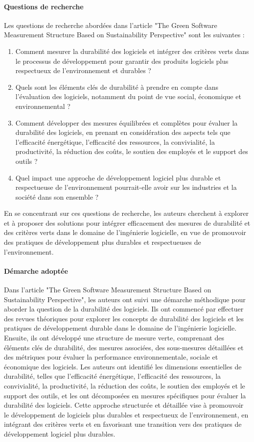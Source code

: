 \paragraph{Questions de recherche}
Les questions de recherche abordées dans l'article "The Green Software Measurement Structure Based on Sustainability Perspective" sont les suivantes :
\begin{enumerate}
    \item Comment mesurer la durabilité des logiciels et intégrer des critères verts dans le processus de développement pour garantir des produits logiciels plus respectueux de l'environnement et durables ?
    \item Quels sont les éléments clés de durabilité à prendre en compte dans l'évaluation des logiciels, notamment du point de vue social, économique et environnemental ?
    \item Comment développer des mesures équilibrées et complètes pour évaluer la durabilité des logiciels, en prenant en considération des aspects tels que l'efficacité énergétique, l'efficacité des ressources, la convivialité, la productivité, la réduction des coûts, le soutien des employés et le support des outils ?
    \item Quel impact une approche de développement logiciel plus durable et respectueuse de l'environnement pourrait-elle avoir sur les industries et la société dans son ensemble ?
\end{enumerate}
En se concentrant sur ces questions de recherche, les auteurs cherchent à explorer et à proposer des solutions pour intégrer efficacement des mesures de durabilité et des critères verts dans le domaine de l'ingénierie logicielle, en vue de promouvoir des pratiques de développement plus durables et respectueuses de l'environnement.

\paragraph{Démarche adoptée}
Dans l'article "The Green Software Measurement Structure Based on Sustainability Perspective", les auteurs ont suivi une démarche méthodique pour aborder la question de la durabilité des logiciels. Ils ont commencé par effectuer des revues théoriques pour explorer les concepts de durabilité des logiciels et les pratiques de développement durable dans le domaine de l'ingénierie logicielle. Ensuite, ils ont développé une structure de mesure verte, comprenant des éléments clés de durabilité, des mesures associées, des sous-mesures détaillées et des métriques pour évaluer la performance environnementale, sociale et économique des logiciels. Les auteurs ont identifié les dimensions essentielles de durabilité, telles que l'efficacité énergétique, l'efficacité des ressources, la convivialité, la productivité, la réduction des coûts, le soutien des employés et le support des outils, et les ont décomposées en mesures spécifiques pour évaluer la durabilité des logiciels. Cette approche structurée et détaillée vise à promouvoir le développement de logiciels plus durables et respectueux de l'environnement, en intégrant des critères verts et en favorisant une transition vers des pratiques de développement logiciel plus durables.

